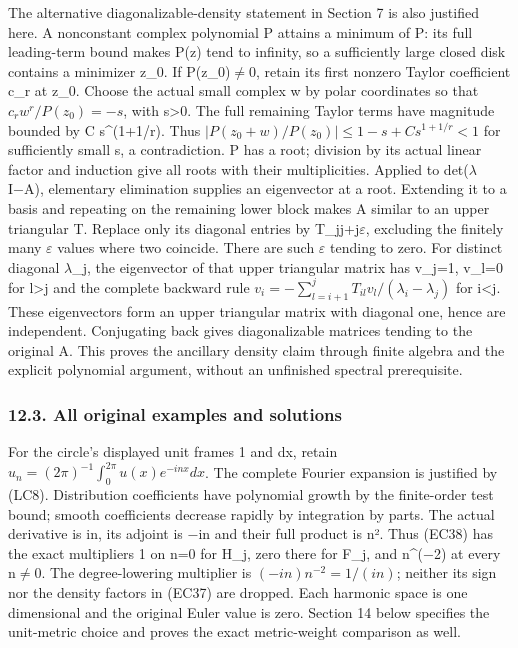 \documentclass[
  11pt,
]{article}
\begin{document}
The alternative diagonalizable-density statement in Section 7 is also
justified here. A nonconstant complex polynomial P attains a minimum of
\textbar P\textbar: its full leading-term bound makes
\textbar P(z)\textbar{} tend to infinity, so a sufficiently large closed
disk contains a minimizer z\_0. If P(z\_0)\ensuremath{\ne}0, retain its first nonzero
Taylor coefficient c\_r at z\_0. Choose the actual small complex w by
polar coordinates so that \(c_rw^r/P(z_0)=-s\), with s\textgreater0. The
full remaining Taylor terms have magnitude bounded by C s\^{}(1+1/r).
Thus \(|P(z_0+w)/P(z_0)|\leq1-s+C s^{1+1/r}<1\) for sufficiently small
s, a contradiction. P has a root; division by its actual linear factor
and induction give all roots with their multiplicities. Applied to
det(\ensuremath{\lambda}I−A), elementary elimination supplies an eigenvector at a root.
Extending it to a basis and repeating on the remaining lower block makes
A similar to an upper triangular T. Replace only its diagonal entries by
T\_jj+j\ensuremath{\varepsilon}, excluding the finitely many \ensuremath{\varepsilon} values where two coincide. There
are such \ensuremath{\varepsilon} tending to zero. For distinct diagonal \ensuremath{\lambda}\_j, the eigenvector
of that upper triangular matrix has v\_j=1, v\_l=0 for l\textgreater j
and the complete backward rule
\(v_i=-\sum_{l=i+1}^jT_{il}v_l/(\lambda_i-\lambda_j)\) for i\textless j.
These eigenvectors form an upper triangular matrix with diagonal one,
hence are independent. Conjugating back gives diagonalizable matrices
tending to the original A. This proves the ancillary density claim
through finite algebra and the explicit polynomial argument, without an
unfinished spectral prerequisite.

\subsubsection{12.3. All original examples and
solutions}\label{all-original-examples-and-solutions}

For the circle's displayed unit frames 1 and dx, retain
\(u_n=(2\pi)^{-1}\int_0^{2\pi}u(x)e^{-inx}dx\). The complete Fourier
expansion is justified by (LC8). Distribution coefficients have
polynomial growth by the finite-order test bound; smooth coefficients
decrease rapidly by integration by parts. The actual derivative is in,
its adjoint is −in and their full product is n². Thus (EC38) has the
exact multipliers 1 on n=0 for H\_j, zero there for F\_j, and n\^{}(−2)
at every n\ensuremath{\ne}0. The degree-lowering multiplier is \((-in)n^{-2}=1/(in)\);
neither its sign nor the density factors in (EC37) are dropped. Each
harmonic space is one dimensional and the original Euler value is zero.
Section 14 below specifies the unit-metric choice and proves the exact
metric-weight comparison as well.
\end{document}

